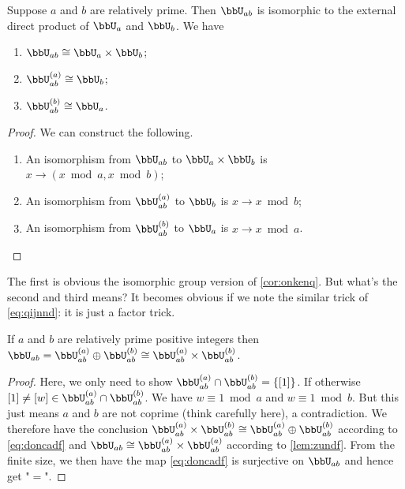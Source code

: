 \documentclass{article}
\begin{document}
\begin{lema}\label{lem:zundf}
Suppose $a$ and $b$ are relatively prime. Then $\bbU_{ab}$ is isomorphic to the external direct product of $\bbU_a$ and $\bbU_b$. We have
\begin{enumerate}
    \item $\bbU_{ab} \cong \bbU_a \times \bbU_b$;
    \item $\bbU_{ab}^{(a)}\cong\bbU_b$;
    \item $\bbU_{ab}^{(b)}\cong\bbU_a$.
\end{enumerate}
\end{lema}
\begin{proof}We can construct the following.
\begin{enumerate}
    \item An isomorphism from $\bbU_{ab}$ to $\bbU_a \times \bbU_b$ is $x \rightarrow(x \bmod a, x \bmod b)$;
    \item An isomorphism from $\bbU_{ab}^{(a)}$ to $\bbU_b$ is $x \rightarrow x \bmod b$;
    \item  An isomorphism from $\bbU_{ab}^{(b)}$ to $\bbU_a$ is $x \rightarrow x \bmod a$. 
\end{enumerate}
\end{proof}
\begin{rema}
The first is obvious the isomorphic group version of \cref{cor:onkenq}. But what's the second and third means? It becomes obvious if we note the similar trick of \cref{eq:qijnnd}: it is just a factor trick. 
\end{rema}
\begin{lema}
If $a$ and $b$ are relatively prime positive integers then $\bbU_{ab}=\bbU_{ab}^{(a)} \oplus \bbU_{ab}^{(b)} \cong\bbU_{ab}^{(a)} \times \bbU_{ab}^{(b)}$.
\end{lema}
\begin{proof}
Here, we only need to show $\bbU_{ab}^{(a)} \cap \bbU_{ab}^{(b)}=\{[1]\}$.  If otherwise $[1]\ne [w] \in \bbU_{ab}^{(a)} \cap \bbU_{ab}^{(b)}$. We have $w\equiv 1\bmod a$ and $w \equiv 1\bmod b$. But this just means $a$ and $b$ are not coprime (think carefully here), a contradiction. We therefore have the conclusion $\bbU_{ab}^{(a)} \times \bbU_{ab}^{(b)}\cong \bbU_{ab}^{(a)} \oplus \bbU_{ab}^{(b)}$ according to \cref{eq:doncadf} and $\bbU_{ab}\cong \bbU_{ab}^{(a)}\times \bbU_{ab}^{(a)}$ according to \cref{lem:zundf}. From the finite size, we then have the map \cref{eq:doncadf} is surjective on $\bbU_{ab}$ and hence get "$=$".
\end{proof}
\end{document}
